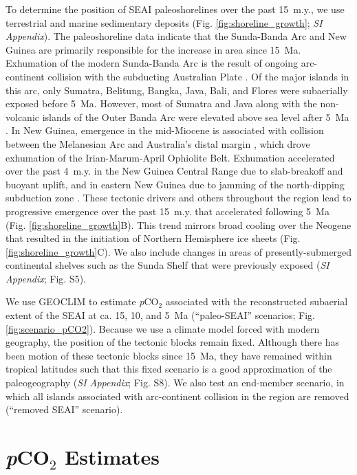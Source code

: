 \documentclass[9pt,twocolumn,twoside,lineno]{pnas-new}
\newcommand{\pCOtwo}{\textit{p}CO$_{2}$\xspace}
\newcommand{\SI}{\textit{SI Appendix}\xspace}
\begin{document}
To determine the position of SEAI paleoshorelines over the past 15~m.y., we use terrestrial and marine sedimentary deposits (Fig. \ref{fig:shoreline_growth}; \SI). The paleoshoreline data indicate that the Sunda-Banda Arc and New Guinea are primarily responsible for the increase in area since 15~Ma. Exhumation of the modern Sunda-Banda Arc is the result of ongoing arc-continent collision with the subducting Australian Plate \cite{Harris2006a}. Of the major islands in this arc, only Sumatra, Belitung, Bangka, Java, Bali, and Flores were subaerially exposed before 5~Ma. However, most of Sumatra and Java along with the non-volcanic islands of the Outer Banda Arc were elevated above sea level after 5~Ma \cite{Hall2013b}. In New Guinea, emergence in the mid-Miocene is associated with collision between the Melanesian Arc and Australia's distal margin \cite{Cloos2005a}, which drove exhumation of the Irian-Marum-April Ophiolite Belt. Exhumation accelerated over the past 4~m.y. in the New Guinea Central Range due to slab-breakoff and buoyant uplift, and in eastern New Guinea due to jamming of the north-dipping subduction zone \cite{Cloos2005a}. These tectonic drivers and others throughout the region lead to progressive emergence over the past 15~m.y. that accelerated following 5~Ma (Fig. \ref{fig:shoreline_growth}B). This trend mirrors broad cooling over the Neogene that resulted in the initiation of Northern Hemisphere ice sheets (Fig. \ref{fig:shoreline_growth}C). We also include changes in areas of presently-submerged continental shelves such as the Sunda Shelf that were previously exposed (\SI; Fig. S5).

We use GEOCLIM to estimate \pCOtwo associated with the reconstructed subaerial extent of the SEAI at ca. 15, 10, and 5~Ma (``paleo-SEAI'' scenarios; Fig. \ref{fig:scenario_pCO2}). Because we use a climate model forced with modern geography, the position of the tectonic blocks remain fixed. Although there has been motion of these tectonic blocks since 15~Ma, they have remained within tropical latitudes such that this fixed scenario is a good approximation of the paleogeography (\SI; Fig. S8). We also test an end-member scenario, in which all islands associated with arc-continent collision in the region are removed (``removed SEAI'' scenario).

\section*{\pCOtwo Estimates}
\end{document}
